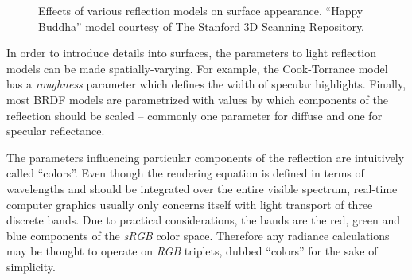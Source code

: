 \begin{figure}[h!]
  \caption{Effects of various reflection models on surface appearance. ``Happy Buddha'' model courtesy of The Stanford 3D Scanning Repository.}
  \label{fig:Buddha_reflectionModels}
\end{figure}

In order to introduce details into surfaces, the parameters to light reflection models can be made spatially-varying. For example, the Cook-Torrance model has a \emph{roughness} parameter which defines the width of specular highlights.  Finally, most BRDF models are parametrized with values by which components of the reflection should be scaled -- commonly one parameter for diffuse and one for specular reflectance.

The parameters influencing particular components of the reflection are intuitively called ``colors''. Even though the rendering equation is defined in terms of wavelengths and should be integrated over the entire visible spectrum, real-time computer graphics usually only concerns itself with light transport of three discrete bands. Due to practical considerations, the bands are the red, green and blue components of the \emph{sRGB} color space. Therefore any radiance calculations may be thought to operate on \emph{RGB} triplets, dubbed ``colors'' for the sake of simplicity.


